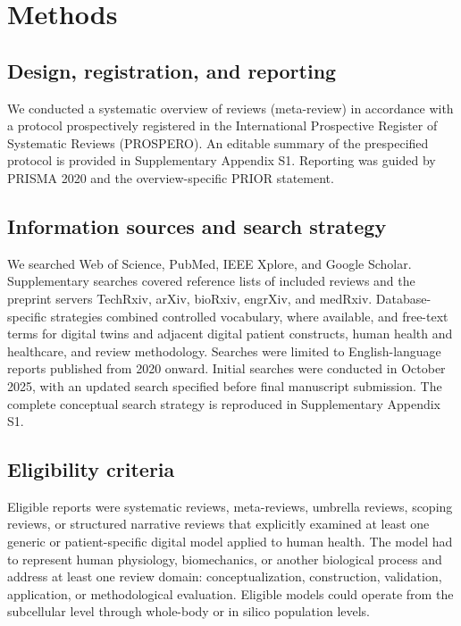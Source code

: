 \section{Methods}

\subsection{Design, registration, and reporting}

We conducted a systematic overview of reviews (meta-review) in accordance with a protocol prospectively registered in the International Prospective Register of Systematic Reviews (PROSPERO). An editable summary of the prespecified protocol is provided in Supplementary Appendix S1. Reporting was guided by PRISMA 2020 and the overview-specific PRIOR statement.\cite{page2021prisma,gates2022prior}


\subsection{Information sources and search strategy}

We searched Web of Science, PubMed, IEEE Xplore, and Google Scholar. Supplementary searches covered reference lists of included reviews and the preprint servers TechRxiv, arXiv, bioRxiv, engrXiv, and medRxiv. Database-specific strategies combined controlled vocabulary, where available, and free-text terms for digital twins and adjacent digital patient constructs, human health and healthcare, and review methodology. Searches were limited to English-language reports published from 2020 onward. Initial searches were conducted in October 2025, with an updated search specified before final manuscript submission. The complete conceptual search strategy is reproduced in Supplementary Appendix S1.


\subsection{Eligibility criteria}

Eligible reports were systematic reviews, meta-reviews, umbrella reviews, scoping reviews, or structured narrative reviews that explicitly examined at least one generic or patient-specific digital model applied to human health. The model had to represent human physiology, biomechanics, or another biological process and address at least one review domain: conceptualization, construction, validation, application, or methodological evaluation. Eligible models could operate from the subcellular level through whole-body or in silico population levels.

